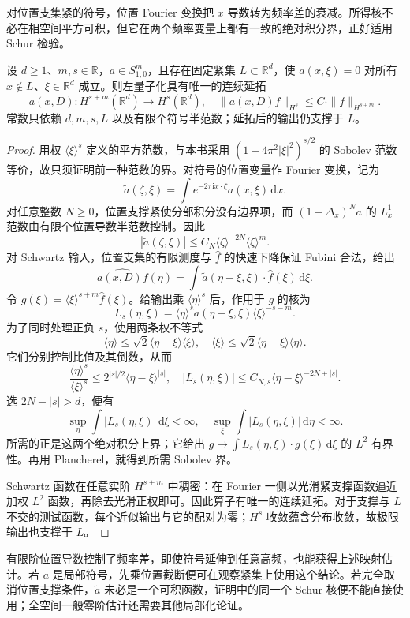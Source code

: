 对位置支集紧的符号，位置 Fourier 变换把 \(x\) 导数转为频率差的衰减。所得核不必在相空间平方可积，但它在两个频率变量上都有一致的绝对积分界，正好适用 Schur 检验。

\begin{proposition}
\label{b2:prop:G-compact-symbol-sobolev}
设 \(d\ge1\)、\(m,s\in\mathbb R\)，\(a\in S^m_{1,0}\)，且存在固定紧集 \(L\subset\mathbb R^d\)，使 \(a(x,\xi)=0\) 对所有 \(x\notin L\)、\(\xi\in\mathbb R^d\) 成立。则左量子化具有唯一的连续延拓
\[
 a(x,D):H^{s+m}(\mathbb R^d)\longrightarrow H^s(\mathbb R^d),
 \quad \|a(x,D)f\|_{H^s}\le C\cdot\|f\|_{H^{s+m}}.
\]
常数只依赖 \(d,m,s,L\) 以及有限个符号半范数；延拓后的输出仍支撑于 \(L\)。
\end{proposition}
\begin{proof}
用权 \(\langle\xi\rangle^s\) 定义的平方范数，与本书采用 \((1+4\pi^2|\xi|^2)^{s/2}\) 的 Sobolev 范数等价，故只须证明前一种范数的界。对符号的位置变量作 Fourier 变换，记为
\[
 \widetilde a(\zeta,\xi)
 =\int e^{-2\pi\mathrm ix\cdot\zeta}a(x,\xi)\,\mathrm dx.
\]
对任意整数 \(N\ge0\)，位置支撑紧使分部积分没有边界项，而 \((1-\Delta_x)^N a\) 的 \(L^1_x\) 范数由有限个位置导数半范数控制。因此
\[
 |\widetilde a(\zeta,\xi)|
 \le C_N\langle\zeta\rangle^{-2N}\langle\xi\rangle^m.
\]
对 Schwartz 输入，位置支集的有限测度与 \(\widehat f\) 的快速下降保证 Fubini 合法，给出
\[
 \widehat{a(x,D)f}(\eta)
 =\int\widetilde a(\eta-\xi,\xi)\cdot\widehat f(\xi)\,\mathrm d\xi.
\]
令 \(g(\xi)=\langle\xi\rangle^{s+m}\widehat f(\xi)\)。给输出乘 \(\langle\eta\rangle^s\) 后，作用于 \(g\) 的核为
\[
 L_s(\eta,\xi)=\langle\eta\rangle^s
       \widetilde a(\eta-\xi,\xi)\langle\xi\rangle^{-s-m}.
\]
为了同时处理正负 \(s\)，使用两条权不等式
\[
 \langle\eta\rangle\le\sqrt2\langle\eta-\xi\rangle\langle\xi\rangle,
 \quad
 \langle\xi\rangle\le\sqrt2\langle\eta-\xi\rangle\langle\eta\rangle.
\]
它们分别控制比值及其倒数，从而
\[
 \frac{\langle\eta\rangle^s}{\langle\xi\rangle^s}
 \le 2^{|s|/2}\langle\eta-\xi\rangle^{|s|},
 \quad
 |L_s(\eta,\xi)|\le C_{N,s}\langle\eta-\xi\rangle^{-2N+|s|}.
\]
选 \(2N-|s|>d\)，便有
\[
 \sup_\eta\int|L_s(\eta,\xi)|\,\mathrm d\xi<\infty,
 \quad
 \sup_\xi\int|L_s(\eta,\xi)|\,\mathrm d\eta<\infty.
\]
所需的正是这两个绝对积分上界；它给出 \(g\mapsto\int L_s(\eta,\xi)\cdot g(\xi)\,\mathrm d\xi\) 的 \(L^2\) 有界性。再用 Plancherel，就得到所需 Sobolev 界。

Schwartz 函数在任意实阶 \(H^{s+m}\) 中稠密：在 Fourier 一侧以光滑紧支撑函数逼近加权 \(L^2\) 函数，再除去光滑正权即可。因此算子有唯一的连续延拓。对于支撑与 \(L\) 不交的测试函数，每个近似输出与它的配对为零；\(H^s\) 收敛蕴含分布收敛，故极限输出也支撑于 \(L\)。
\end{proof}
有限阶位置导数控制了频率差，即使符号延伸到任意高频，也能获得上述映射估计。若 \(a\) 是局部符号，先乘位置截断便可在观察紧集上使用这个结论。若完全取消位置支撑条件，\(\widetilde a\) 未必是一个可积函数，证明中的同一个 Schur 核便不能直接使用；全空间一般零阶估计还需要其他局部化论证。


